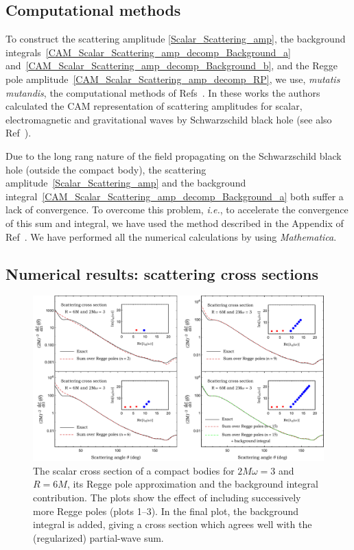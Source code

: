 \documentclass[aps,prd,longbibliography,reprint,twocolumn,amsmath,amssymb,amsfonts,showpacs,footnote,superscriptaddress]{revtex4-1}%
\begin{document}
\subsection{Computational methods}
\label{SecIIIa}

To construct the scattering amplitude \eqref{Scalar_Scattering_amp}, the background integrals~\eqref{CAM_Scalar_Scattering_amp_decomp_Background_a} and~\eqref{CAM_Scalar_Scattering_amp_decomp_Background_b}, and the Regge pole amplitude~\eqref{CAM_Scalar_Scattering_amp_decomp_RP}, we use, \textit{mutatis mutandis}, the computational methods of Refs~\cite{Folacci:2019cmc,Folacci:2019vtt}. In these works the authors calculated the CAM representation of scattering amplitudes for scalar, electromagnetic and gravitational waves by Schwarzschild black hole (see also Ref~\cite{Dolan:2017rtj}).

Due to the long rang nature of the field propagating on the Schwarzschild black hole (outside the compact body), the scattering amplitude~\eqref{Scalar_Scattering_amp} and the background integral~\eqref{CAM_Scalar_Scattering_amp_decomp_Background_a} both suffer a lack of convergence. To overcome this problem, \textit{i.e.}, to accelerate the convergence of this sum and integral, we have used the method described in the Appendix of Ref~\cite{Folacci:2019cmc}. We have performed all the numerical calculations by using {\it Mathematica}. %


\subsection{Numerical results: scattering cross sections}
\label{subsec:results2}

\begin{figure}[htp!]
 \includegraphics[scale=0.50]{Scattering_Cross_Section_R_6_2Mw_3}
  \vspace*{-0.35cm}
\caption{\label{S_0_R_6_2Mw_3_Exact_vs_CAM} The scalar cross section of a compact bodies for $2M\omega=3$ and $R=6M$, its Regge pole approximation and the background integral contribution. The plots show the effect of including successively more Regge poles (plots 1--3). In the final plot, the background integral is added, giving a cross section which agrees well with the (regularized) partial-wave sum.}
\end{figure}
\end{document}
